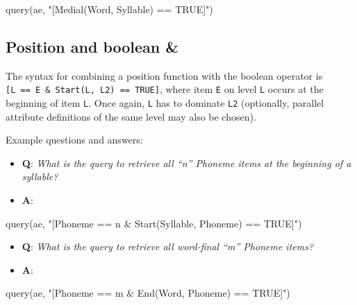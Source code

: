 \documentclass[
]{book}
\newenvironment{Shaded}{\begin{snugshade}}{\end{snugshade}}
\newcommand{\FunctionTok}[1]{\textcolor[rgb]{0.00,0.00,0.00}{#1}}
\newcommand{\NormalTok}[1]{#1}
\newcommand{\StringTok}[1]{\textcolor[rgb]{0.31,0.60,0.02}{#1}}
\providecommand{\tightlist}{%
  \setlength{\itemsep}{0pt}\setlength{\parskip}{0pt}}
\begin{document}
\begin{Shaded}
\begin{Highlighting}[]
\FunctionTok{query}\NormalTok{(ae, }\StringTok{"[Medial(Word, Syllable) == TRUE]"}\NormalTok{)}
\end{Highlighting}
\end{Shaded}

\hypertarget{position-and-boolean}{%
\subsection{Position and boolean \&}\label{position-and-boolean}}

The syntax for combining a position function with the boolean operator is \texttt{{[}L\ ==\ E\ \&\ Start(L,\ L2)\ ==\ TRUE{]}}, where item \texttt{E} on level \texttt{L} occurs at the beginning of item \texttt{L}. Once again, \texttt{L} has to dominate \texttt{L2} (optionally, parallel attribute definitions of the same level may also be chosen).

Example questions and answers:

\begin{itemize}
\tightlist
\item
  \textbf{Q}: \emph{What is the query to retrieve all ``n'' Phoneme items at the beginning of a syllable?}
\item
  \textbf{A}:
\end{itemize}

\begin{Shaded}
\begin{Highlighting}[]
\FunctionTok{query}\NormalTok{(ae, }\StringTok{"[Phoneme == n \& Start(Syllable, Phoneme) == TRUE]"}\NormalTok{)}
\end{Highlighting}
\end{Shaded}

\begin{itemize}
\tightlist
\item
  \textbf{Q}: \emph{What is the query to retrieve all word-final ``m'' Phoneme items?}
\item
  \textbf{A}:
\end{itemize}

\begin{Shaded}
\begin{Highlighting}[]
\FunctionTok{query}\NormalTok{(ae, }\StringTok{"[Phoneme == m \& End(Word, Phoneme) == TRUE]"}\NormalTok{)}
\end{Highlighting}
\end{Shaded}
\end{document}
